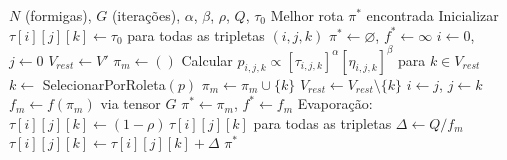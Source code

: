 \begin{algorithm}[htbp]
\caption{ACO com Feromônio 3D para TSP-SD-ATP}
\label{alg:aco}
\begin{algorithmic}[1]
\REQUIRE $N$ (formigas), $G$ (iterações), $\alpha$, $\beta$, $\rho$, $Q$, $\tau_0$
\ENSURE Melhor rota $\pi^*$ encontrada
\STATE Inicializar $\tau[i][j][k] \leftarrow \tau_0$ para todas as tripletas $(i,j,k)$
\STATE $\pi^* \leftarrow \varnothing$, $f^* \leftarrow \infty$
    \STATE $i \leftarrow 0$, $j \leftarrow 0$ 
    \STATE $V_{\textit{rest}} \leftarrow V'$ 
    \STATE $\pi_m \leftarrow ()$
      \STATE Calcular $p_{i,j,k} \propto [\tau_{i,j,k}]^\alpha [\eta_{i,j,k}]^\beta$ para $k \in V_{\textit{rest}}$
      \STATE $k \leftarrow$ SelecionarPorRoleta$(p)$
      \STATE $\pi_m \leftarrow \pi_m \cup \{k\}$
      \STATE $V_{\textit{rest}} \leftarrow V_{\textit{rest}} \setminus \{k\}$
      \STATE $i \leftarrow j$, $j \leftarrow k$
    \ENDWHILE
    \STATE $f_m \leftarrow f(\pi_m)$ via tensor $G$
      \STATE $\pi^* \leftarrow \pi_m$, $f^* \leftarrow f_m$
    \ENDIF
  \ENDFOR
  \STATE Evaporação: $\tau[i][j][k] \leftarrow (1-\rho)\,\tau[i][j][k]$ para todas as tripletas
    \STATE $\Delta \leftarrow Q / f_m$
      \STATE $\tau[i][j][k] \leftarrow \tau[i][j][k] + \Delta$
    \ENDFOR
  \ENDFOR
\ENDFOR
\RETURN $\pi^*$
\end{algorithmic}
\end{algorithm}
